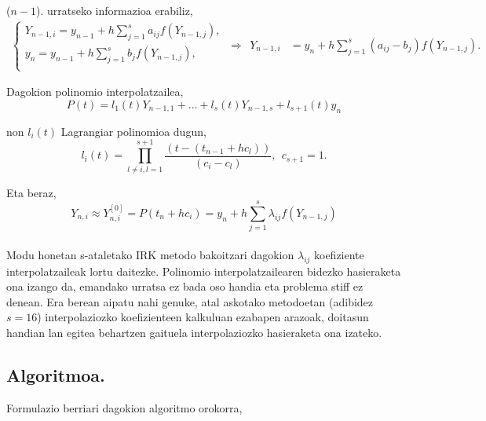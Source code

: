 \paragraph*{}($n-1$). urratseko informazioa erabiliz,
\begin{align*}
\left \{ \begin{array}{c}
Y_{n-1,i} =y_{n-1}+h \sum\limits_{j=1}^{s} a_{ij} f(Y_{n-1,j}),\\
y_n =y_{n-1}+h \sum\limits_{j=1}^{s} b_j f(Y_{n-1,j}),\\
\end{array} \right.
\ \Rightarrow \ \ 
Y_{n-1,i} &=y_n+h \sum\limits_{j=1}^{s} (a_{ij}-b_j) f(Y_{n-1,j}).
\end{align*}

Dagokion polinomio interpolatzailea,
\begin{equation*}
P(t)=  l_1(t) Y_{n-1,1}+\dots+l_s(t) Y_{n-1,s}+l_{s+1}(t) y_n
\end{equation*}
  
non $l_i(t)$ Lagrangiar polinomioa dugun,
\begin{equation*}
 l_i(t)=\prod_{l\neq i,l=1}^{s+1} \frac{(t-(t_{n-1}+hc_l))}{(c_i-c_l)}, \ \ c_{s+1}=1.
\end{equation*}

Eta beraz,
\begin{equation}
Y_{n,i} \approx Y_{n,i}^{[0]}= P(t_n+hc_i) = y_n+ h \sum\limits_{j=1}^{s} \lambda_{ij}f(Y_{n-1,j})
\end{equation}

\paragraph*{} Modu honetan s-ataletako IRK metodo bakoitzari dagokion $\lambda_{ij}$ koefiziente interpolatzaileak lortu daitezke. Polinomio interpolatzailearen bidezko hasieraketa ona izango da, emandako urratsa ez bada oso handia eta problema stiff ez denean. Era berean aipatu nahi genuke, atal askotako metodoetan (adibidez $s=16$)  interpolaziozko koefizienteen kalkuluan ezabapen arazoak,  doitasun handian lan egitea behartzen gaituela interpolaziozko hasieraketa ona izateko.  

\subsection{Algoritmoa.}

Formulazio berriari dagokion algoritmo orokorra,

